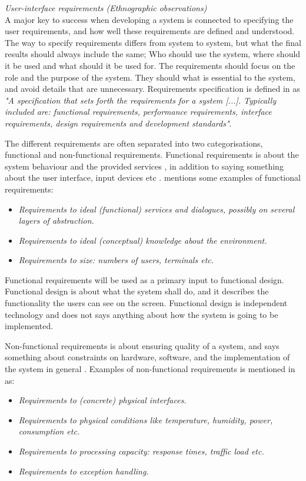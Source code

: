 \emph{User-interface requirements (Ethnographic observations)}\\
A major key to success when developing a system is connected to specifying the user requirements, and how well these requirements are defined and understood.  The way to specify requirements differs from system to system, but what the final results should always include the same; Who should use the system, where should it be used and what should it be used for. The requirements should focus on the role and the purpose of the system. They should what is essential to the system, and avoid details that are unnecessary. Requirements specification is defined in \cite{systemutviklingDel1} as \emph{"A specification that sets forth the requirements for a system [...]. Typically included are: functional requirements, performance requirements, interface requirements, design requirements and development standards"}. 

The different requirements are often separated into two categorisations, functional and non-functional requirements. Functional requirements is about the system behaviour and the provided services \cite{systemutviklingDel1}, in addition to saying something about the user interface, input devices etc \cite{mmi}. \cite{systemutviklingDel1} mentions some examples of functional requirements:
\begin{itemize}
\item \emph{Requirements to ideal (functional) services and dialogues, possibly on several layers of abstraction.}
\item \emph{Requirements to ideal (conceptual) knowledge about the environment.}
\item \emph{Requirements to size: numbers of users, terminals etc.}
\end{itemize}     

Functional requirements will be used as a primary input to functional design. Functional design is about what the system shall do, and it describes the functionality the users can see on the screen. Functional design is independent technology and does not says anything about how the system is going to be implemented. 

Non-functional requirements is about ensuring quality of a system, and says something about constraints on hardware, software, and the implementation of the system in general \cite{mmi}. Examples of non-functional requirements is mentioned in \cite{systemutviklingDel1} as:
\begin{itemize}
\item \emph{Requirements to (concrete) physical interfaces.}
\item \emph{Requirements to physical conditions like temperature, humidity, power, consumption etc.}
\item \emph{Requirements to processing capacity: response times, traffic load etc.}
\item \emph{Requirements to exception handling.} \\ \\ 
\end{itemize}   

